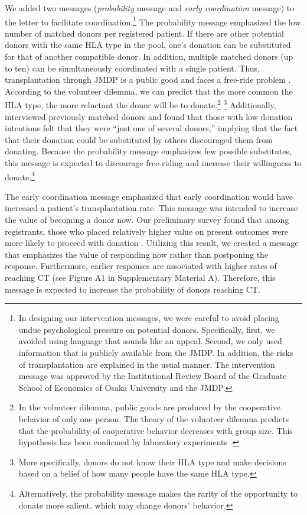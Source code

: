 \documentclass[12pt, a4paper]{article}
\begin{document}
We added two messages (\emph{probability} message and \emph{early coordination} message) to the letter to facilitate coordination.\footnote{In designing our intervention messages, we were careful to avoid placing undue psychological pressure on potential donors. Specifically, first, we avoided using language that sounds like an appeal. Second, we only used information that is publicly available from the JMDP. In addition, the risks of transplantation are explained in the usual manner. The intervention message was approved by the Institutional Review Board of the Graduate School of Economics of Osaka University and the JMDP.} The probability message emphasized the low number of matched donors per registered patient. If there are other potential donors with the same HLA type in the pool, one's donation can be substituted for that of another compatible donor. In addition, multiple matched donors (up to ten) can be simultaneously coordinated with a single patient. Thus, transplantation through JMDP is a public good and faces a free-ride problem \citep{Bergstrom2009}. According to the volunteer dilemma, we can predict that the more common the HLA type, the more reluctant the donor will be to donate.\footnote{In the volunteer dilemma, public goods are produced by the cooperative behavior of only one person. The theory of the volunteer dilemma predicts that the probability of cooperative behavior decreases with group size. This hypothesis has been confirmed by laboratory experiments \citep{Diekmann1985, Diekmann1986, Goeree2017}.} \footnote{More specifically, donors do not know their HLA type and make decisions based on a belief of how many people have the same HLA type.} Additionally, \citet{Kurosawa2022} interviewed previously matched donors and found that those with low donation intentions felt that they were ``just one of several donors,'' implying that the fact that their donation could be substituted by others discouraged them from donating. Because the probability message emphasizes few possible substitutes, this message is expected to discourage free-riding and increase their willingness to donate.\footnote{Alternatively, the probability message makes the rarity of the opportunity to donate more salient, which may change donors' behavior.}

The early coordination message emphasized that early coordination would have increased a patient's transplantation rate. This message was intended to increase the value of becoming a donor now. Our preliminary survey found that among registrants, those who placed relatively higher value on present outcomes were more likely to proceed with donation \citep{Ohtake2020}. Utilizing this result, we created a message that emphasizes the value of responding now rather than postponing the response. Furthermore, earlier responses are associated with higher rates of reaching CT (see Figure A1 in Supplementary Material A). Therefore, this message is expected to increase the probability of donors reaching CT.
\end{document}
